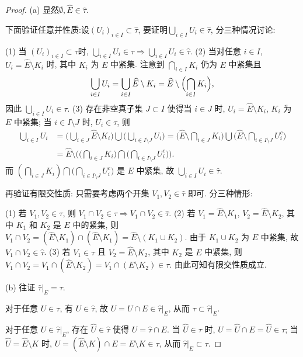 \begin{proof}
(a) 显然$\emptyset,\widehat{E}\in\widehat{\tau}$.

下面验证任意并性质:设$(U_i)_{i\in I}\subset\widehat{\tau}$,
要证明$\bigcup_{i\in I}U_i\in\widehat{\tau}$, 分三种情况讨论:

(1) 当 $(U_i)_{i\in I}\subset\tau$时, $\bigcup_{i\in I}U_i\in\tau\Rightarrow\bigcup_{i\in I}U_i\in\widehat{\tau}$.
(2) 当对任意 $i\in I$, $U_i=\widehat{E}\setminus K_i$ 时, 其中 $K_i$ 为 $E$ 中紧集.
      注意到 $\bigcap_{i\in I}K_i$ 仍为 $E$ 中紧集且
      \[\bigcup_{i\in I}U_i=\bigcup_{i\in I}\widehat{E}\setminus K_i=\widehat{E}\setminus\Bigl(\bigcap_{i\in I}K_i\Bigr),\]
      因此 $\bigcup_{i\in I}U_i\in\tau$.
(3) 存在非空真子集 $J\subset I$ 使得当 $i\in J$ 时, $U_i=\widehat{E}\setminus K_i$, 
$K_i$ 为 $E$ 中紧集; 当 $i\in I\setminus J$ 时, $U_i\in\tau$, 则
\begin{align*}
\bigcup_{i\in I}U_i
&=\bigg(\bigcup_{i\in J}\widehat{E}\setminus K_i\bigg)\bigcup\bigg(\bigcup_{i\in I\setminus J}U_i\bigg)=\biggl(\widehat{E}\setminus\bigcap_{i\in J}K_i\biggr)\bigcup\biggl(\widehat{E}\setminus\bigcap_{i\in I\setminus J}U_i^c\biggr) \\
&=\widehat{E}\setminus\biggl(\biggl(\bigcap_{i\in J}K_i\biggr)\bigcap\biggl(\bigcap_{i\in I\setminus J}U_i^c\biggr)\biggr). 
\end{align*}
而 $\left(\bigcap_{i\in J}K_i\right)\bigcap\bigl(\bigcap_{i\in I\setminus J}U_i^c\bigr)$ 是 $E$  中紧集,
故 $\bigcup_{i\in I}U_i\in\widehat{\tau}$.

再验证有限交性质: 只需要考虑两个开集 $V_1,V_2\in\widehat{\tau}$ 即可. 分三种情形:

(1) 若 $V_1,V_2\in\tau$, 则 $V_1\cap V_2\in\tau\Rightarrow V_1\cap V_2\in\widehat{\tau}$.
(2) 若 $V_1=\widehat{E}\setminus K_1$, $V_2=\widehat{E}\setminus K_2$, 其中 $K_1$ 和 $K_2$
是 $E$ 中的紧集, 则 $V_1\cap V_2=(\widehat{E}\setminus K_1)\cap(\widehat{E}\setminus K_1)=\widehat{E}\setminus (K_1\cup K_2)$.
由于 $K_1\cup K_2$ 为 $E$ 中紧集, 故 $V_1\cap V_2\in\widehat{\tau}$.
(3) 若 $V_1\in\tau$ 且 $V_2=\widehat{E}\setminus K_2$, 其中 $K_2$ 是 $E$ 中紧集, 则
$V_1\cap V_2=V_1\cap(\widehat{E}\setminus K_2)=V_1\cap(E\setminus K_2)\in\tau$.
由此可知有限交性质成立.

(b) 往证 $\widehat{\tau}|_E=\tau$.

对于任意 $U\in\tau$, 有 $U\in\widehat{\tau}$, 故 $U=U\cap E\in\widehat{\tau}|_E$, 从而 $\tau\subset\widehat{\tau}|_E$.

对于任意 $U\in\widehat{\tau}|_E$, 存在 $\widehat{U}\in\widehat{\tau}$ 使得 $U=\widehat{\tau}\cap E$.
当 $\widehat{U}\in\tau$ 时, $U=\widehat{U}\cap E=\widehat{U}\in\tau$;
当 $\widehat{U}=\widehat{E}\setminus K$ 时, $U=(\widehat{E}\setminus K)\cap E=E\setminus K\in\tau$,
从而 $\widehat{\tau}|_E\subset\tau$.


\end{proof}
